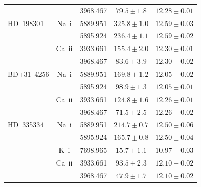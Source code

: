 \documentclass[fleqn,usenatbib]{mnras}
\begin{document}
\begin{table}
\begin{tabular}{lcccc}
 & & 3968.467 & $79.5\pm1.8$ & $12.28\pm0.01$ \\
HD~198301 & Na~{\sc i} & 5889.951 & $325.8\pm1.0$ & $12.59\pm0.03$ \\
 & & 5895.924 & $236.4\pm1.1$ & $12.59\pm0.02$ \\
 & Ca~{\sc ii} & 3933.661 & $155.4\pm2.0$ & $12.30\pm0.01$ \\
 & & 3968.467 & $83.6\pm3.9$ & $12.30\pm0.02$ \\
BD+31~4256 & Na~{\sc i} & 5889.951 & $169.8\pm1.2$ & $12.05\pm0.02$ \\
 & & 5895.924 & $98.9\pm1.3$ & $12.05\pm0.01$ \\
 & Ca~{\sc ii} & 3933.661 & $124.8\pm1.6$ & $12.26\pm0.01$ \\
 & & 3968.467 & $71.5\pm2.5$ & $12.26\pm0.02$ \\
HD~335334 & Na~{\sc i} & 5889.951 & $214.7\pm0.7$ & $12.50\pm0.06$ \\
 & & 5895.924 & $165.7\pm0.8$ & $12.50\pm0.04$ \\
 & K~{\sc i} & 7698.965 & $15.7\pm1.1$ & $10.97\pm0.03$ \\
 & Ca~{\sc ii} & 3933.661 & $93.5\pm2.3$ & $12.10\pm0.02$ \\
 & & 3968.467 & $47.9\pm1.7$ & $12.10\pm0.02$ \\
\hline
\end{tabular}
\end{table}
\end{document}
